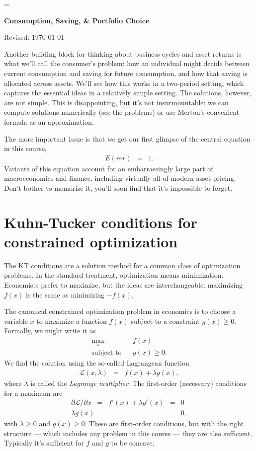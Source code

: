 \documentclass[11pt]{article}
\begin{document}
\parskip=\bigskipamount
\parindent=0.0in
\thispagestyle{empty}


\bigskip\bigskip
\centerline{\Large \bf Consumption, Saving, \& Portfolio Choice}
\centerline{Revised: \today}

\medskip
Another building block for thinking about business cycles
and asset returns is what we'll call the consumer's problem:
how an individual might decide between current consumption
and saving for future consumption,
and how that saving is allocated across assets.
We'll see how this works in a two-period setting,
which captures the essential ideas in a relatively simple setting.
The solutions, however, are not simple.
This is disappointing, but it's not insurmountable:
we can compute solutions numerically (see the problems) or use Merton's convenient
formula as an approximation.

The more important issue is that we get our first glimpse of the central equation in this course,
\begin{eqnarray}
    E (mr) &=& 1 .
    \label{eq:E(mr)=1}
\end{eqnarray}
Variants of this equation account for
an embarrassingly large part of macroeconomics and finance,
including virtually all of modern asset pricing.
Don't bother to memorize it,
you'll soon find that it's impossible to forget.


\section{Kuhn-Tucker conditions for constrained optimization}

The KT conditions are a solution method for a common class of optimization problems.
In the standard treatment, optimization means minimization.
Economists prefer to maximize, but the ideas are interchangeable:
maximizing $f(x)$ is the same as minimizing $-f(x)$.

The canonical constrained optimization problem in economics
is to choose a variable $x$ to maximize a function
$f(x)$ subject to a constraint $g(x) \geq 0$.
Formally, we might write it as
\begin{eqnarray*}
    \max_x && f(x) \\
    \mbox{subject to} && g(x) \geq 0 .
\end{eqnarray*}
We find the solution using the so-called Lagrangean function
\begin{eqnarray*}
    \mathcal{L}(x,\lambda) &=& f(x) + \lambda g(x) ,
\end{eqnarray*}
where $\lambda$ is called the {\it Lagrange multiplier\/}.
The first-order (necessary) conditions for a maximum are
\begin{eqnarray*}
   \partial \mathcal{L}/\partial x \;\;=\;\; f'(x) + \lambda g'(x) &=&  0 \\
   \lambda g(x) &=& 0 ,
\end{eqnarray*}
with  $\lambda \geq 0$ and $g(x) \geq 0$.
These are first-order conditions,
but with the right structure --- which includes any problem in this course ---
they are also sufficient.
Typically it's sufficient for $f$ and $g$ to be concave.
\end{document}
